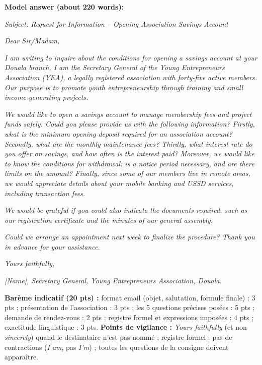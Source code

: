 \documentclass[11pt]{article}
\begin{document}
\begin{corrige}
\textbf{Model answer (about 220 words):}

\emph{Subject: Request for Information -- Opening Association Savings Account}

\emph{Dear Sir/Madam,}

\emph{I am writing to inquire about the conditions for opening a savings account at your Douala branch. I am the Secretary General of the Young Entrepreneurs Association (YEA), a legally registered association with forty-five active members. Our purpose is to promote youth entrepreneurship through training and small income-generating projects.}

\emph{We would like to open a savings account to manage membership fees and project funds safely. Could you please provide us with the following information? Firstly, what is the minimum opening deposit required for an association account? Secondly, what are the monthly maintenance fees? Thirdly, what interest rate do you offer on savings, and how often is the interest paid? Moreover, we would like to know the conditions for withdrawal: is a notice period necessary, and are there limits on the amount? Finally, since some of our members live in remote areas, we would appreciate details about your mobile banking and USSD services, including transaction fees.}

\emph{We would be grateful if you could also indicate the documents required, such as our registration certificate and the minutes of our general assembly.}

\emph{Could we arrange an appointment next week to finalize the procedure? Thank you in advance for your assistance.}

\emph{Yours faithfully,}

\emph{[Name], Secretary General, Young Entrepreneurs Association, Douala.}

\textbf{Barème indicatif (20 pts) :} format email (objet, salutation, formule finale) : 3 pts ; présentation de l'association : 3 pts ; les 5 questions précises posées : 5 pts ; demande de rendez-vous : 2 pts ; registre formel et expressions imposées : 4 pts ; exactitude linguistique : 3 pts.
\textbf{Points de vigilance :} \emph{Yours faithfully} (et non \emph{sincerely}) quand le destinataire n'est pas nommé ; registre formel : pas de contractions (\emph{I am}, pas \emph{I'm}) ; toutes les questions de la consigne doivent apparaître.
\end{corrige}
\end{document}
